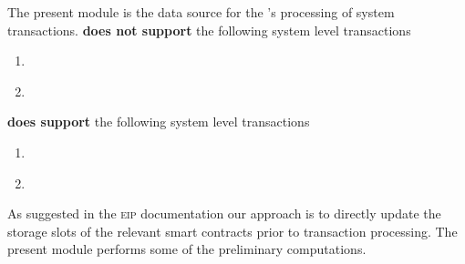 The present module is the data source for the \zkEvm's processing of system transactions.
\linea{} \textbf{does not support} the following system level transactions
\begin{multicols}{2}
	\begin{enumerate}
		\item \cite{EIP-7002}
		\item \cite{EIP-7251}
	\end{enumerate}
\end{multicols}
\noindent
\linea{} \textbf{does support} the following system level transactions
\begin{multicols}{2}
	\begin{enumerate}
		\item \cite{EIP-4788}
		\item \cite{EIP-2935}
	\end{enumerate}
\end{multicols}
As suggested in the \textsc{eip} documentation our approach is to directly update the storage slots of the relevant smart contracts prior to transaction processing.
The present module performs some of the preliminary computations.

